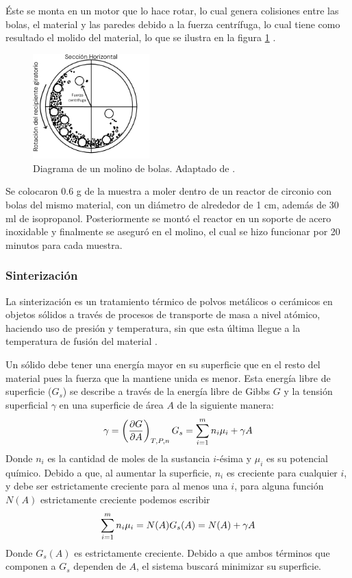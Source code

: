 \documentclass[../main.tex]{subfiles}
\begin{document}
Éste se monta en un motor que lo hace rotar, lo cual genera colisiones entre las bolas, el material y las paredes debido a la fuerza centrífuga, lo cual tiene como resultado el molido del material, lo que se ilustra en la figura \ref{fig:molinodiag} \cite{Baheti2012}.
\begin{figure}[H]
    \centering
    \includegraphics[width=0.4\textwidth]{fig/molinodiag.png}
    \caption{Diagrama de un molino de bolas. Adaptado de \cite{Baheti2012}.}
    \label{fig:molinodiag}
\end{figure}
Se colocaron 0.6 g de la muestra a moler dentro de un reactor de circonio con bolas del mismo material, con un diámetro de alrededor de 1 cm, además de 30 ml de isopropanol. Posteriormente se montó el reactor en un soporte de acero inoxidable y finalmente se aseguró en el molino, el cual se hizo funcionar por 20 minutos para cada muestra.

\subsubsection{Sinterización} \label{sec:sinter}
La sinterización es un tratamiento térmico de polvos metálicos o cerámicos en objetos sólidos a través de procesos de transporte de masa a nivel atómico, haciendo uso de presión y temperatura, sin que esta última llegue a la temperatura de fusión del material \cite{Banerjee2019}.

Un sólido debe tener una energía mayor en su superficie que en el resto del material pues la fuerza que la mantiene unida es menor. Esta energía libre de superficie ($G_s$) se describe a través de la energía libre de Gibbs $G$ y la tensión superficial $\gamma$ en una superficie de área $A$ de la siguiente manera:
\begin{equation}
    \gamma=\left(\dfrac{\partial G}{\partial A}\right)_{T,P,n}\\
    G_s=\sum_{i=1}^{m} n_i \mu_i + \gamma A
    \label{eq:energiasuperficie}
\end{equation}
Donde $n_i$ es la cantidad de moles de la sustancia $i$-ésima y $\mu_i$ es su potencial químico. Debido a que, al aumentar la superficie, $n_i$ es creciente para cualquier $i$, y debe ser estrictamente creciente para al menos una $i$, para alguna función $N(A)$ estrictamente creciente podemos escribir
\begin{equation}
    \sum_{i=1}^{m} n_i \mu_i = N(A)\\
    G_s(A)=N(A)+\gamma A
    \label{eq:energiasuperficiedepA}
\end{equation}
Donde $G_s(A)$ es estrictamente creciente. Debido a que ambos términos que componen a $G_s$ dependen de $A$, el sistema buscará minimizar su superficie.
\end{document}
